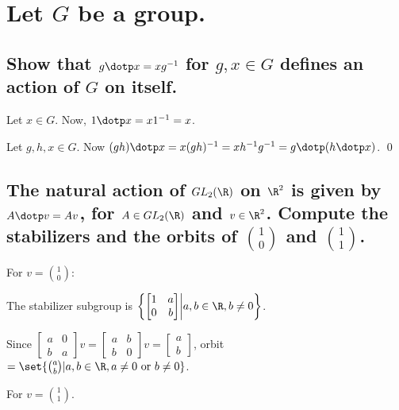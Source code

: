 \section[Problem 1]{Let $G$ be a group.}
    \subsection[(i)]{Show that $g \dotp x = xg^{-1}$ for $g,x\in G$ defines an action of $G$ on itself.}
        Let $x \in G$.
        Now, $1 \dotp x = x1^{-1} = x$.

        Let $g,h, x \in G$.
        Now $(gh) \dotp x = x (gh)^{-1} = x h^{-1} g^{-1} = g \dotp (h \dotp x)$.
        \qed

    \subsection[(ii)]{The natural action of $GL_2(\R)$ on $\R^2$ is given by $A \dotp v = Av$,
        for $A \in GL_2(\R)$ and $v \in \R^2$. Compute the stabilizers and the orbits of
        $\binom{1}{0}$ and $\binom{1}{1}$.}

        For $v = \binom{1}{0}$:

        The stabilizer subgroup is 
        \(
            \left\{
                \begin{bmatrix}
                    1 & a \\
                    0 & b
                \end{bmatrix}
                \middle|
                a,b \in \R, b \neq 0
            \right\}
        \).

        Since
        \(
            \begin{bmatrix}
                a & 0 \\
                b & a
            \end{bmatrix}
            v
            =
            \begin{bmatrix}
                a & b \\
                b & 0
            \end{bmatrix}
            v
            =
            \begin{bmatrix}
                a \\
                b
            \end{bmatrix}
        \),
        orbit $= \set{\binom{a}{b} | a, b \in \R, a \neq 0 \text{ or } b \neq 0}$.


        For $v = \binom{1}{1}$.


